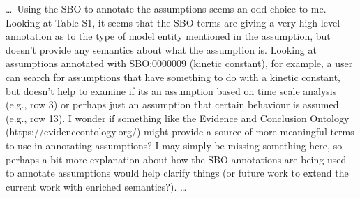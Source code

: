 \documentclass{article}
\begin{document}




\begin{mdframed}
\ldots\, Using the SBO to annotate the assumptions seems an odd choice to me.
Looking at Table S1, it seems that the SBO terms are giving a very high level annotation as to the type of model entity mentioned in the assumption, but doesn't provide any semantics about what the assumption is.
Looking at assumptions annotated with SBO:0000009 (kinetic constant), for example, a user can search for assumptions that have something to do with a kinetic constant, but doesn't help to examine if its an assumption based on time scale analysis (e.g., row 3) or perhaps just an assumption that certain behaviour is assumed (e.g., row 13).
I wonder if something like the Evidence and Conclusion Ontology (https://evidenceontology.org/) might provide a source of more meaningful terms to use in annotating assumptions?
I may simply be missing something here, so perhaps a bit more explanation about how the SBO annotations are being used to annotate assumptions would help clarify things (or future work to extend the current work with enriched semantics?). \ldots
\end{mdframed}
\end{document}
